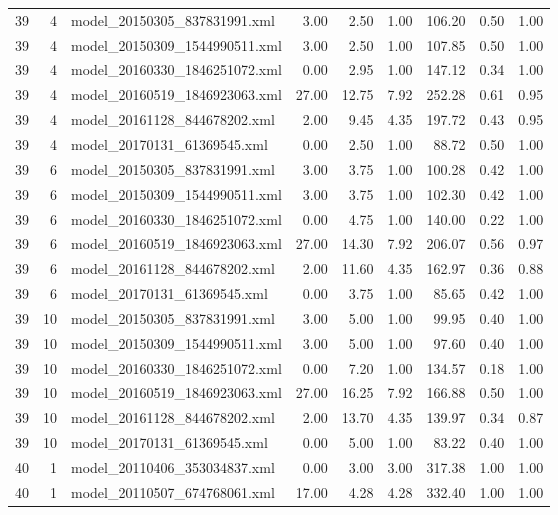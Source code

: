 \begin{table}[ht]
\begin{tabular}{rrlrrrrrr}
   39 &   4 & model\_20150305\_837831991.xml & 3.00 & 2.50 & 1.00 & 106.20 & 0.50 & 1.00 \\ 
   39 &   4 & model\_20150309\_1544990511.xml & 3.00 & 2.50 & 1.00 & 107.85 & 0.50 & 1.00 \\ 
   39 &   4 & model\_20160330\_1846251072.xml & 0.00 & 2.95 & 1.00 & 147.12 & 0.34 & 1.00 \\ 
   39 &   4 & model\_20160519\_1846923063.xml & 27.00 & 12.75 & 7.92 & 252.28 & 0.61 & 0.95 \\ 
   39 &   4 & model\_20161128\_844678202.xml & 2.00 & 9.45 & 4.35 & 197.72 & 0.43 & 0.95 \\ 
   39 &   4 & model\_20170131\_61369545.xml & 0.00 & 2.50 & 1.00 & 88.72 & 0.50 & 1.00 \\ 
   39 &   6 & model\_20150305\_837831991.xml & 3.00 & 3.75 & 1.00 & 100.28 & 0.42 & 1.00 \\ 
   39 &   6 & model\_20150309\_1544990511.xml & 3.00 & 3.75 & 1.00 & 102.30 & 0.42 & 1.00 \\ 
   39 &   6 & model\_20160330\_1846251072.xml & 0.00 & 4.75 & 1.00 & 140.00 & 0.22 & 1.00 \\ 
   39 &   6 & model\_20160519\_1846923063.xml & 27.00 & 14.30 & 7.92 & 206.07 & 0.56 & 0.97 \\ 
   39 &   6 & model\_20161128\_844678202.xml & 2.00 & 11.60 & 4.35 & 162.97 & 0.36 & 0.88 \\ 
   39 &   6 & model\_20170131\_61369545.xml & 0.00 & 3.75 & 1.00 & 85.65 & 0.42 & 1.00 \\ 
   39 &  10 & model\_20150305\_837831991.xml & 3.00 & 5.00 & 1.00 & 99.95 & 0.40 & 1.00 \\ 
   39 &  10 & model\_20150309\_1544990511.xml & 3.00 & 5.00 & 1.00 & 97.60 & 0.40 & 1.00 \\ 
   39 &  10 & model\_20160330\_1846251072.xml & 0.00 & 7.20 & 1.00 & 134.57 & 0.18 & 1.00 \\ 
   39 &  10 & model\_20160519\_1846923063.xml & 27.00 & 16.25 & 7.92 & 166.88 & 0.50 & 1.00 \\ 
   39 &  10 & model\_20161128\_844678202.xml & 2.00 & 13.70 & 4.35 & 139.97 & 0.34 & 0.87 \\ 
   39 &  10 & model\_20170131\_61369545.xml & 0.00 & 5.00 & 1.00 & 83.22 & 0.40 & 1.00 \\ 
   40 &   1 & model\_20110406\_353034837.xml & 0.00 & 3.00 & 3.00 & 317.38 & 1.00 & 1.00 \\ 
   40 &   1 & model\_20110507\_674768061.xml & 17.00 & 4.28 & 4.28 & 332.40 & 1.00 & 1.00 \\ 

\end{tabular}
\end{table}
